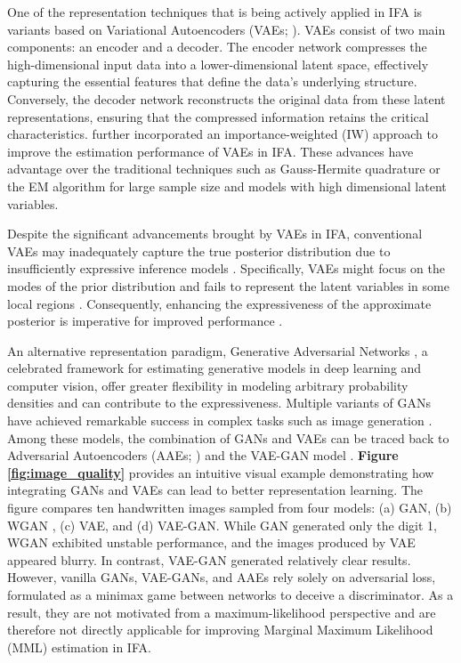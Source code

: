 \documentclass[a4paper,12pt]{article}
\theoremstyle{plain} %
\theoremstyle{remark} %
\theoremstyle{definition} %
\begin{document}
One of the representation techniques that is being actively applied in IFA \citep{hui2017variational,jeon2017variational,cho2021gaussian} is variants based on Variational Autoencoders (VAEs; \citealp{curi2019interpretable, wu2020variational}). VAEs consist of two main components: an encoder and a decoder. The encoder network compresses the high-dimensional input data into a lower-dimensional latent space, effectively capturing the essential features that define the data's underlying structure. Conversely, the decoder network reconstructs the original data from these latent representations, ensuring that the compressed information retains the critical characteristics. \citet{urban2021deep} further incorporated an importance-weighted (IW) approach \citep{burda2015importance} to improve the estimation performance of VAEs in IFA. These advances have advantage over the traditional  techniques such as Gauss-Hermite quadrature or the EM algorithm \citep{darrell1970fitting,bock1981marginal,cai2010high} for large sample size and models with high dimensional latent variables.

Despite the significant advancements brought by VAEs in IFA, conventional VAEs may inadequately capture the true posterior distribution due to insufficiently expressive inference models \citep{mescheder2017adversarial}. Specifically, VAEs might focus on the modes of the prior distribution and fails to represent the latent variables in some local regions \citep{makhzani2015adversarial}. Consequently, enhancing the expressiveness of the approximate posterior is imperative for improved performance \citep{cremer2018inference}. 

An alternative representation paradigm, Generative Adversarial Networks \citep[GANs,][]{goodfellow2014generative}, a celebrated framework for estimating generative models in deep learning and computer vision, offer greater flexibility in modeling arbitrary probability densities and can contribute to the expressiveness. Multiple variants of GANs have achieved remarkable success in complex tasks such as image generation \citep[e.g.,][]{radford2015unsupervised, arjovsky2017wasserstein, zhu2017unpaired}. Among these models, the combination of GANs and VAEs can be traced back to Adversarial Autoencoders (AAEs; \citealp{makhzani2015adversarial}) and the VAE-GAN model \citep{larsen2016autoencoding}. \textbf{Figure \ref{fig:image_quality}} provides an intuitive visual example demonstrating how integrating GANs and VAEs can lead to better representation learning. The figure compares ten handwritten images sampled from four models: (a) GAN, (b) WGAN \citep[a GAN variant,][]{arjovsky2017wasserstein}, (c) VAE, and (d) VAE-GAN. While GAN generated only the digit 1, WGAN exhibited unstable performance, and the images produced by VAE appeared blurry. In contrast, VAE-GAN generated relatively clear results. However, vanilla GANs, VAE-GANs, and AAEs rely solely on adversarial loss, formulated as a minimax game between networks to deceive a discriminator. As a result, they are not motivated from a maximum-likelihood perspective and are therefore not directly applicable for improving Marginal Maximum Likelihood (MML) estimation in IFA.
\end{document}
